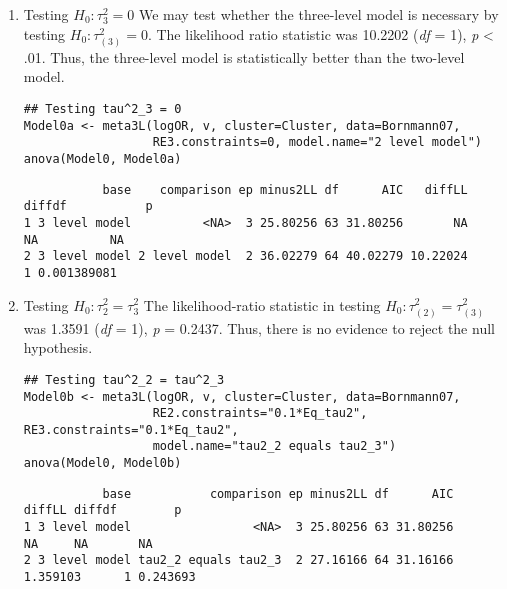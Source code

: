 \documentclass[11pt]{article}
\begin{document}
\begin{enumerate}
\item Testing \(H_0: \tau^2_3 = 0\)
\label{sec:org6b09d03}
We may test whether the three-level model is necessary by testing \(H_0: \tau^2_{(3)} = 0\). The likelihood ratio statistic was 10.2202 (\emph{df} = 1), \emph{p} < .01. Thus, the three-level model is statistically better than the two-level model.
\begin{verbatim}
## Testing tau^2_3 = 0
Model0a <- meta3L(logOR, v, cluster=Cluster, data=Bornmann07, 
                  RE3.constraints=0, model.name="2 level model")
anova(Model0, Model0a)
\end{verbatim}

\begin{verbatim}
           base    comparison ep minus2LL df      AIC   diffLL diffdf           p
1 3 level model          <NA>  3 25.80256 63 31.80256       NA     NA          NA
2 3 level model 2 level model  2 36.02279 64 40.02279 10.22024      1 0.001389081
\end{verbatim}

\item Testing \(H_0: \tau^2_2 = \tau^2_3\)
\label{sec:orged1887c}
The likelihood-ratio statistic in testing \(H_0: \tau^2_{(2)} = \tau^2_{(3)}\) was 1.3591 (\emph{df} = 1), \emph{p} = 0.2437. Thus, there is no evidence to reject the null hypothesis.
\begin{verbatim}
## Testing tau^2_2 = tau^2_3
Model0b <- meta3L(logOR, v, cluster=Cluster, data=Bornmann07, 
                  RE2.constraints="0.1*Eq_tau2", RE3.constraints="0.1*Eq_tau2", 
                  model.name="tau2_2 equals tau2_3")
anova(Model0, Model0b)
\end{verbatim}

\begin{verbatim}
           base           comparison ep minus2LL df      AIC   diffLL diffdf        p
1 3 level model                 <NA>  3 25.80256 63 31.80256       NA     NA       NA
2 3 level model tau2_2 equals tau2_3  2 27.16166 64 31.16166 1.359103      1 0.243693
\end{verbatim}
\end{enumerate}
\end{document}
